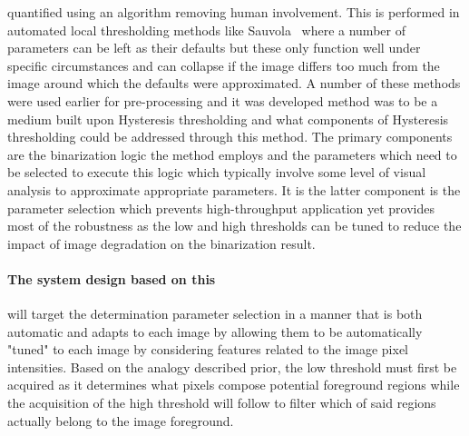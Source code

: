 quantified using an algorithm removing human involvement. This is performed in automated local thresholding methods like Sauvola~\cite{adapt_sauvola} where a number of parameters can be left as their defaults but these only function well under specific circumstances and can collapse if the image differs too much from the image around which the defaults were approximated. A number of these methods were used earlier for pre-processing and it was 
developed method was to be a medium built upon Hysteresis thresholding and what components of Hysteresis thresholding could be addressed through this method. The primary components are the binarization logic the method employs and the parameters which need to be selected to execute this logic which typically involve some level of visual analysis to approximate appropriate parameters. It is the latter component is the parameter selection which prevents high-throughput application yet provides most of the robustness as the low and high thresholds can be tuned to reduce the impact of image degradation on the binarization result.\paragraph{The system design based on this} will target the determination parameter selection in a manner that is both automatic and adapts to each image by allowing them to be automatically "tuned" to each image by considering features related to the image pixel intensities. Based on the analogy described prior, the low threshold must first be acquired as it determines what pixels compose potential foreground regions while the acquisition of the high threshold will follow to filter which of said regions actually belong to the image foreground.
